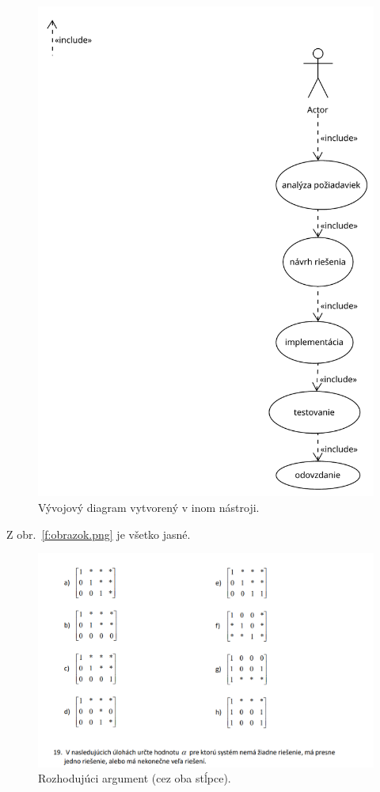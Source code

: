 \documentclass[10pt,twocolumn,twoside,slovak,a4paper]{article}
\begin{document}
\begin{figure}[h!]
    \centering
    \includegraphics[scale=0.3]{flowchart.pdf}
    \caption{Vývojový diagram vytvorený v inom nástroji.}
    \label{fig:graphic}
\end{figure}
Z obr.~\ref{f:obrazok.png} je všetko jasné. 

\begin{figure}[t!]
\centering
\includegraphics[width=\textwidth]{obrazok.png}
\caption{Rozhodujúci argument (cez oba stĺpce).}
\label{f:obrazok}
\end{figure}
\end{document}
